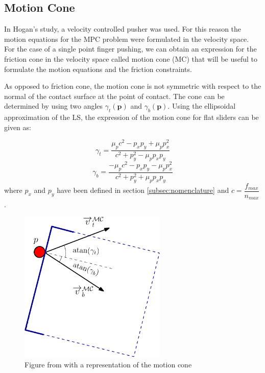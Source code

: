 \documentclass[12,twoside]{TFG-GM}
\theoremstyle{definition}
\theoremstyle{remark}
\begin{document}
\subsection{Motion Cone}
In Hogan's study, a velocity controlled pusher was used. For this reason the motion equations for the MPC problem were formulated in the velocity space. For the case of a single point finger pushing, we can obtain an expression for the friction cone in the velocity space called motion cone (MC) \cite{pushing4} that will be useful to formulate the motion equations and the friction constraints.

As opposed to friction cone, the motion cone is not symmetric with respect to the normal of the contact surface at the point of contact. The cone can be determined by using two angles $\gamma_{t}(\textbf{p})$ and $\gamma_b(\textbf{p})$. Using the ellipsoidal approximation of the LS, the expression of the motion cone for flat sliders can be given as:

\begin{equation}
\gamma_t = \dfrac{\mu_p c^2 - p_x p_y + \mu_p p_x^2}{c^2 + p_y^2 - \mu_p p_x p_y}
\end{equation}
\begin{equation}
\gamma_b = \dfrac{-\mu_p c^2 - p_x p_y - \mu_p p_x^2}{c^2 + p_y^2 + \mu_p p_x p_y}
\end{equation}
where $p_x$ and $p_y$ have been defined in section \ref{subsec:nomenclature} and $c = \dfrac{f_{max}}{n_{max}}$.

\begin{figure}[htb!]
\begin{center}
\includegraphics[width=7cm]{MotionCone-eps-converted-to.pdf}
\end{center}
\caption[test caption]{\label{fig:motion_cone} \small{Figure from \protect\cite{fom} with a representation of the motion cone}}
\end{figure}
\end{document}
